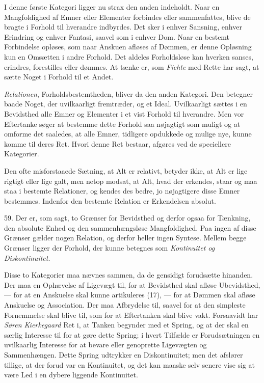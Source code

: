 \documentclass[12pt,a4paper]{book}
\newcommand{\opage}[1]{\marginnote{\footnotesize\textit{[#1]}}}
\begin{document}
I denne første Kategori ligger nu strax den anden indeholdt. Naar en
Mangfoldighed af Emner eller Elementer forbindes eller sammenfattes, blive de
bragte i Forhold til hverandre indbyrdes. Det sker i enhver Sansning, enhver
Erindring og enhver Fantasi, saavel som i enhver Dom. Naar en bestemt
Forbindelse opløses, som naar Anskuen afløses af Dømmen, er denne
Opløsning kun en Omsætten i andre Forhold. Det aldeles Forholdsløse kan
hverken sanses, erindres, forestilles eller dømmes. At tænke er, som
\emph{Fichte} med Rette har sagt, at sætte Noget i Forhold til et Andet.

\emph{Relationen}, Forholdsbestemtheden, bliver da den anden
\opage{156}Kategori. Den
betegner baade Noget, der uvilkaarligt fremtræder, og et Ideal.
Uvilkaarligt sættes i en Bevidsthed alle Emner og Elementer i et vist
Forhold til hverandre. Men vor Eftertanke søger at bestemme dette Forhold
saa nøjagtigt som muligt og at omforme det saaledes, at alle Emner,
tidligere opdukkede og mulige nye, kunne komme til deres Ret. Hvori denne Ret
bestaar, afgøres ved de speciellere Kategorier.

Den ofte misforstaaede Sætning, at Alt er relativt, betyder ikke, at Alt er
lige rigtigt eller lige galt, men netop modsat, at Alt, hvad der erkendes,
staar og maa staa i bestemte Relationer, og kendes des bedre, jo
nøjagtigere disse Emner bestemmes. Indenfor den bestemte Relation er
Erkendelsen absolut.

59. Der er, som sagt, to Grænser for Bevidsthed og derfor ogsaa for
Tænkning, den absolute Enhed og den sammenhængsløse Mangfoldighed. Paa
ingen af disse Grænser gælder nogen Relation, og derfor heller ingen
Syntese. Mellem begge Grænser ligger der Forhold, der kunne betegnes som
\emph{Kontinuitet og Diskontinuitet}.

Disse to Kategorier maa nævnes sammen, da de gensidigt forudsætte hinanden.
Der maa en Ophævelse af Ligevægt til, for at Bevidsthed skal afløse
Ubevidsthed, --- for at en Anskuelse skal kunne artikuleres (17), --- for at
Dømmen skal afløse Anskuelse og Association. Der maa Afbrydelse til, saavel
for at den simpleste Fornemmelse skal blive til, som for at Eftertanken skal
blive vakt. Forsaavidt har \emph{Søren Kierkegaard} Ret i, at Tanken
begynder med et Spring, og at der skal en særlig Interesse til for at gøre
dette Spring; i hvert Tilfælde er Forudsætningen en uvilkaarlig Interesse
for at bevare eller genoprette Ligevægten og Sammenhængen. Dette Spring
udtrykker en Diskontinuitet; men det afslører tillige, at der forud var en
Kontinuitet, og det kan maaske selv senere vise sig at være Led i en dybere
liggende Kontinuitet.
\end{document}
